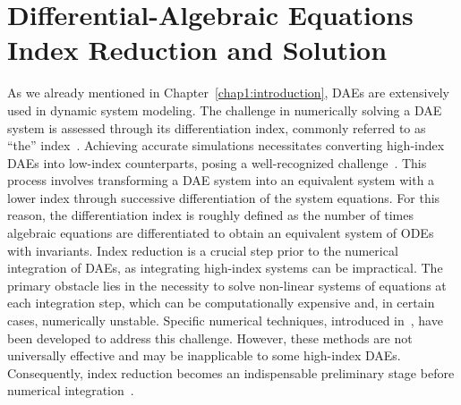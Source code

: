 
\section{Differential-Algebraic Equations Index Reduction and Solution}
\label{chap3:sec:introduction}

As we already mentioned in Chapter~\ref{chap1:introduction}, \acp{DAE} are extensively used in dynamic system modeling. The challenge in numerically solving a \ac{DAE} system is assessed through its differentiation index, commonly referred to as ``the'' index~\cite{campbell1995index, campbell1995highindex}. Achieving accurate simulations necessitates converting high-index \acp{DAE} into low-index counterparts, posing a well-recognized challenge~\cite{petzold1982differential}. This process involves transforming a \ac{DAE} system into an equivalent system with a lower index through successive differentiation of the system equations. For this reason, the differentiation index is roughly defined as the number of times algebraic equations are differentiated to obtain an equivalent system of \acp{ODE} with invariants. Index reduction is a crucial step prior to the numerical integration of \acp{DAE}, as integrating high-index systems can be impractical. The primary obstacle lies in the necessity to solve non-linear systems of equations at each integration step, which can be computationally expensive and, in certain cases, numerically unstable. Specific numerical techniques, introduced in~\cite{petzold1982differential, thomsen1999numerical, baumgarte1972stabilization}, have been developed to address this challenge. However, these methods are not universally effective and may be inapplicable to some high-index \acp{DAE}. Consequently, index reduction becomes an indispensable preliminary stage before numerical integration~\cite{lamour2013differential}.

